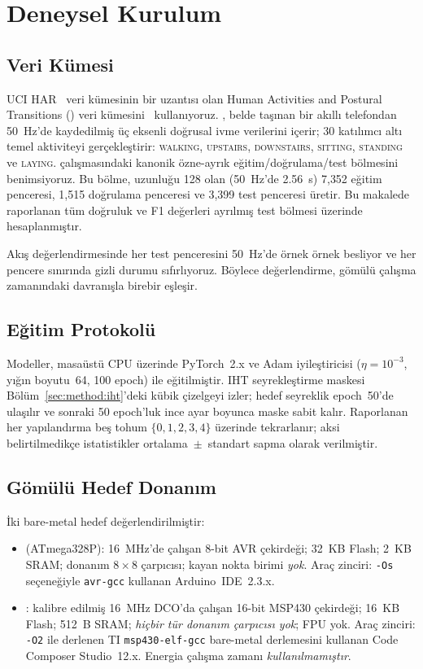 \section{Deneysel Kurulum}
\label{sec:setup}

\subsection{Veri Kümesi}

UCI HAR~\cite{anguita2013public} veri kümesinin bir uzantısı olan
Human Activities and Postural Transitions (\hapt{})
veri kümesini~\cite{reyes2015transition} kullanıyoruz. \hapt{},
belde taşınan bir akıllı telefondan 50~Hz'de kaydedilmiş üç eksenli
doğrusal ivme verilerini içerir; 30 katılımcı altı temel aktiviteyi
gerçekleştirir: \textsc{walking}, \textsc{upstairs},
\textsc{downstairs}, \textsc{sitting}, \textsc{standing} ve
\textsc{laying}. \cite{reyes2015transition} çalışmasındaki kanonik
özne-ayrık eğitim/doğrulama/test bölmesini benimsiyoruz. Bu bölme,
uzunluğu 128 olan (50~Hz'de 2.56~s) 7{,}352 eğitim penceresi,
1{,}515 doğrulama penceresi ve 3{,}399 test penceresi üretir. Bu
makalede raporlanan tüm doğruluk ve F1 değerleri ayrılmış test
bölmesi üzerinde hesaplanmıştır.

Akış değerlendirmesinde her test penceresini 50~Hz'de örnek örnek
besliyor ve her pencere sınırında gizli durumu sıfırlıyoruz. Böylece
değerlendirme, gömülü çalışma zamanındaki davranışla birebir eşleşir.

\subsection{Eğitim Protokolü}

Modeller, masaüstü CPU üzerinde PyTorch~2.x ve Adam iyileştiricisi
($\eta{=}10^{-3}$, yığın boyutu~64, 100 epoch) ile eğitilmiştir. IHT
seyrekleştirme maskesi Bölüm~\ref{sec:method:iht}'deki kübik
çizelgeyi izler; hedef seyreklik epoch~50'de ulaşılır ve sonraki
50 epoch'luk ince ayar boyunca maske sabit kalır. Raporlanan her
yapılandırma beş tohum $\{0, 1, 2, 3, 4\}$ üzerinde tekrarlanır;
aksi belirtilmedikçe istatistikler ortalama~$\pm$~standart sapma
olarak verilmiştir.

\subsection{Gömülü Hedef Donanım}

İki bare-metal hedef değerlendirilmiştir:
\begin{itemize}
\item \textbf{\arduino{}} (ATmega328P): 16~MHz'de çalışan 8-bit AVR
çekirdeği; 32~KB Flash; 2~KB SRAM; donanım $8{\times}8$ çarpıcısı;
kayan nokta birimi \emph{yok}. Araç zinciri: \texttt{-Os}
seçeneğiyle \texttt{avr-gcc} kullanan Arduino~IDE~2.3.x.
\item \textbf{\msp{}}: kalibre edilmiş 16~MHz DCO'da çalışan 16-bit
MSP430 çekirdeği; 16~KB Flash; 512~B SRAM; \emph{hiçbir tür donanım
çarpıcısı yok}; FPU yok. Araç zinciri: \texttt{-O2} ile derlenen TI
\texttt{msp430-elf-gcc} bare-metal derlemesini kullanan Code
Composer Studio~12.x. Energia çalışma zamanı \emph{kullanılmamıştır}.
\end{itemize}

